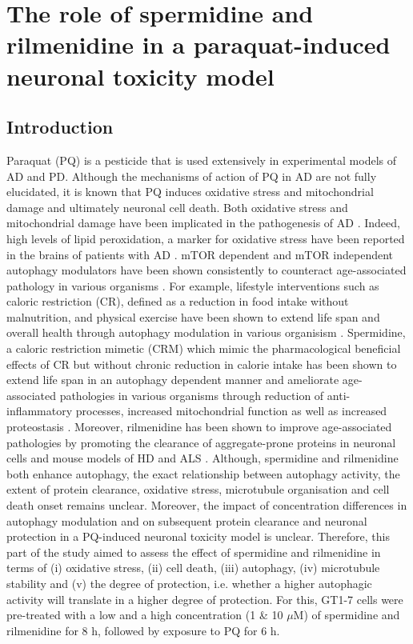 \chapter{The role of spermidine and rilmenidine in a paraquat-induced neuronal toxicity model}
\label{sec:chapter4}
\section{Introduction}
Paraquat (PQ) is a pesticide that is used extensively in experimental models of AD and PD. Although the mechanisms of action of PQ in AD are not fully elucidated, it is known that PQ induces oxidative stress and mitochondrial damage \citep{Chen2012} and ultimately neuronal cell death. Both oxidative stress and mitochondrial damage have been implicated in the pathogenesis of AD \citep{Chen2012,Lin2006}. Indeed, high levels of lipid peroxidation, a marker for oxidative stress have been reported in the brains of patients with AD \citep{Wang2014,Zhao2013}. mTOR dependent and mTOR independent autophagy modulators have been shown consistently to counteract age-associated pathology in various organisms \citep{lumkwana2017}. For example, lifestyle interventions such as caloric restriction (CR), defined as a reduction in food intake without malnutrition,  and physical exercise have been shown to extend life span and overall health through autophagy modulation in various organisism \citep{Law2018,Frederiksen2017,Liu2019,Lin2017}. Spermidine, a caloric restriction mimetic (CRM) which mimic the pharmacological beneficial effects of CR but without chronic reduction in calorie intake has been shown to extend life span in an autophagy dependent manner and ameliorate age-associated pathologies in various organisms \citep{Buttner2014,Eisenberg2016a,Gupta2016,Morselli2011,Morselli2009,Sigrist2014,Yue2017,Zhang2017} through reduction of anti-inflammatory processes, increased mitochondrial function as well as increased proteostasis \citep{Madeo2018}. Moreover, rilmenidine has been shown to improve age-associated pathologies by promoting the clearance of aggregate-prone proteins in neuronal cells and mouse models of HD and ALS \citep{Perera2018,Rose2010}. Although, spermidine and rilmenidine both enhance autophagy, the exact relationship between autophagy activity, the extent of protein clearance, oxidative stress, microtubule organisation and cell death onset remains unclear. Moreover, the impact of concentration differences in autophagy modulation and on subsequent protein clearance and neuronal protection in a PQ-induced neuronal toxicity model is unclear. Therefore, this part of the study aimed to assess the effect of spermidine and rilmenidine in terms of (i) oxidative stress, (ii) cell death, (iii) autophagy, (iv) microtubule stability and (v) the degree of protection, i.e. whether a higher autophagic activity will translate in a higher degree of protection. For this, GT1-7 cells were pre-treated with a low and a high concentration (1 \& 10 $\mu$M) of spermidine and rilmenidine for 8 h, followed by exposure to PQ for 6 h.

